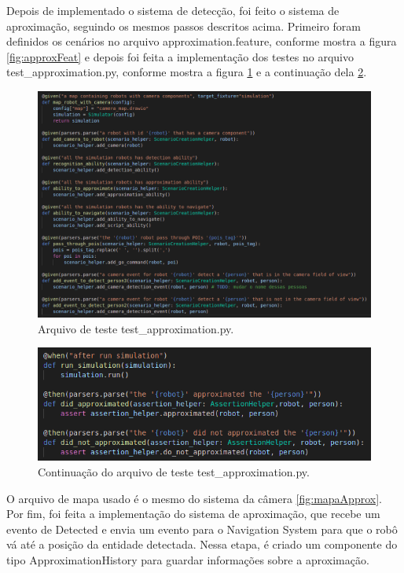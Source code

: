 Depois de implementado o sistema de detecção, foi feito o sistema de aproximação, seguindo os mesmos passos descritos acima. Primeiro foram definidos os cenários no arquivo approximation.feature, conforme mostra a figura \ref{fig:approxFeat} e depois foi feita a implementação dos testes no arquivo test\_approximation.py, conforme mostra a figura \ref{fig:Appr1} e a continuação dela \ref{fig:Appr2}. 

\begin{figure}
\centering
\includegraphics[width=\textwidth]{imagens/Appr1.png}
\caption{Arquivo de teste test\_approximation.py.} 
\label{fig:Appr1}
\end{figure}

\begin{figure}
\centering
\includegraphics[width=\textwidth]{imagens/Appr2.png}
\caption{Continuação do arquivo de teste test\_approximation.py.} 
\label{fig:Appr2}
\end{figure}

O arquivo de mapa usado é o mesmo do sistema da câmera \ref{fig:mapaApprox}. 
Por fim, foi feita a implementação do sistema de aproximação, que recebe um evento de Detected e envia um evento para o Navigation System para que o robô vá até a posição da entidade detectada. Nessa etapa, é criado um componente do tipo ApproximationHistory para guardar informações sobre a aproximação. 

